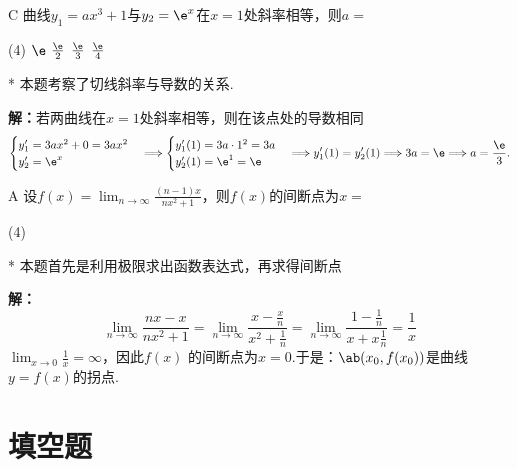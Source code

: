 \begin{choice}{C}
    曲线$y_{1}=ax^3+1$与$y_{2}=\e^{x}$在$x=1$处斜率相等，则$a=$
    \begin{tasks}(4)
        \task $\e $
        \task $\frac{\e }{2}$
        \task $\frac{\e }{3}$
        \task $\frac{\e }{4}$
    \end{tasks}
\end{choice}
\begin{solution}*
    本题考察了切线斜率与导数的关系.
    
    \textbf{解：}若两曲线在$x=1$处斜率相等，则在该点处的导数相同
    \[\begin{aligned}
        \begin{cases}
            y_{1}'=3ax^2+0=3ax^2\\
            y_{2}'=\e^x\\
        \end{cases}\Longrightarrow
        \begin{cases}
            y_{1}'(1) =3a\cdot 1^2=3a\\
            y_{2}'(1) =\e^1=\e \\
        \end{cases}\Longrightarrow y_{1}'(1) =y_{2}'(1)
        \Longrightarrow 3a=\e \Longrightarrow a=\frac{\e }{3}.
    \end{aligned}\]
\end{solution}

\begin{choice}{A}
    设$f(x) =\lim_{n\to \infty} \frac{(n-1)x}{nx^2+1}$，则$f(x) $的间断点为$x=$ 
    \begin{tasks}(4)
    \end{tasks}
\end{choice}
\begin{solution}*
    本题首先是利用极限求出函数表达式，再求得间断点

    \textbf{解：}
    \[\underset{n\to \infty}{\lim}\frac{nx-x}{nx^2+1}=\underset{n\to \infty}{\lim}\frac{x-\frac{x}{n}}{x^2+\frac{1}{n}}=\underset{n\to \infty}{\lim}\frac{1-\frac{1}{n}}{x+x\frac{1}{n}}=\frac{1}{x}\]
    $\lim_{x\to 0} \frac{1}{x} = \infty$，因此$ f(x)$ 的间断点为$x=0$.于是：$\ab(x_0,f(x_0))$是曲线$y=f(x)$的拐点.
\end{solution}

\section{填空题}

